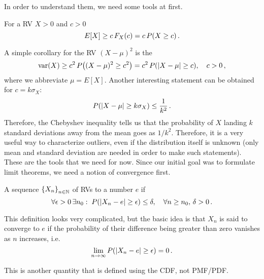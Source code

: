 In order to understand them, we need some tools at first.
\begin{prop}
For a RV $X > 0$ and $c > 0$
\begin{equation}
E[X] \geq c \, F_X(c) = c \, P\qty(X \geq c) \, .
\end{equation}
\end{prop}
A simple corollary for the RV $(X - \mu)^2$ is the 
\begin{equation}\label{eq:cor_markov}
\operatorname{var}(X) \geq c^2 \, P\qty((X - \mu)^2 \geq c^2) = c^2 \, P\qty(\abs{X - \mu} \geq c), \quad c > 0 \, ,
\end{equation}
where we abbreviate $\mu = E[X]$. Another interesting statement can be obtained for $c = k \sigma_X$:
\begin{equation}
P\qty(\abs{X - \mu} \geq k \sigma_X) \leq \frac{1}{k^2} \, .
\end{equation}
Therefore, the Chebyshev inequality tells us that the probability of $X$ landing $k$ standard deviations away from the mean goes as $1 / k^2$. Therefore, it is a very useful way to characterize outliers, even if the distribution itself is unknown (only mean and standard deviation are needed in order to make such statements).\\


These are the tools that we need for now. Since our initial goal was to formulate limit theorems, we need a notion of convergence first.
\begin{defi}
A sequence $\qty{X_n}_{n \in \mathbb{N}}$ of RVs  to a number $e$ if
\begin{equation}
\forall \epsilon > 0 \, \exists n_0: \; P\qty(\abs{X_n - e} \geq \epsilon) \leq \delta, \quad \forall n \geq n_0, \, \delta > 0 \, .
\end{equation}
\end{defi}
This definition looks very complicated, but the basic idea is that $X_n$ is said to converge to $e$ if the probability of their difference being greater than zero vanishes as $n$ increases, i.e.
\begin{equation}
\lim_{n \rightarrow \infty} P\qty(\abs{X_n - e} \geq \epsilon) = 0 \, .
\end{equation}

This is another quantity that is defined using the CDF, not PMF/PDF.


